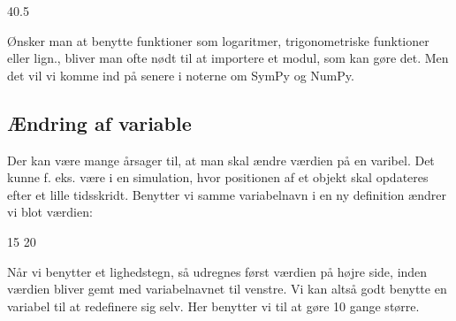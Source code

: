 \documentclass[letterpaper,10pt,english]{jupyterBook}
\begin{document}
\begin{sphinxVerbatim}[commandchars=\\\{\}]
40.5
\end{sphinxVerbatim}

Ønsker man at benytte funktioner som logaritmer, trigonometriske funktioner eller lign., bliver man ofte nødt til at importere et modul, som kan gøre det. Men det vil vi komme ind på senere i noterne om SymPy og NumPy.


\subsection{Ændring af variable}
\label{\detokenize{notebooks/Basal_python:aendring-af-variable}}
Der kan være mange årsager til, at man skal ændre værdien på en varibel. Det kunne f. eks. være i en simulation, hvor positionen af et objekt skal opdateres efter et lille tidsskridt. Benytter vi samme variabelnavn i en ny definition ændrer vi blot værdien:

\begin{sphinxVerbatim}[commandchars=\\\{\}]
  
 
   
 
\end{sphinxVerbatim}

\begin{sphinxVerbatim}[commandchars=\\\{\}]
15
20
\end{sphinxVerbatim}

Når vi benytter et lighedstegn, så udregnes først værdien på højre side, inden værdien bliver gemt med variabelnavnet til venstre. Vi kan altså godt benytte en variabel til at redefinere sig selv. Her benytter vi  til at gøre  10 gange større.

\begin{sphinxVerbatim}[commandchars=\\\{\}]
  
      
     
\end{sphinxVerbatim}
\end{document}

